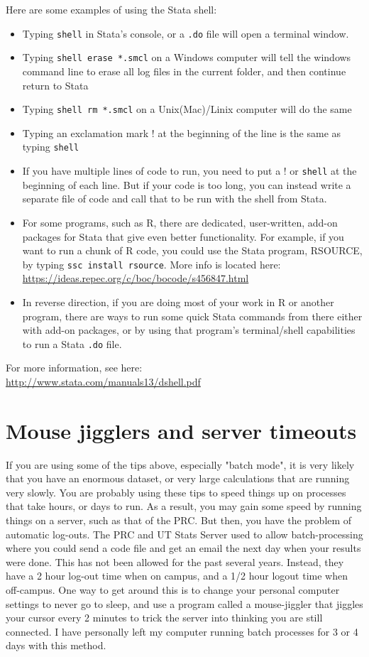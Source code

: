 \documentclass[11pt]{article}
\begin{document}
\noindent Here are some examples of using the Stata shell:
\begin{itemize}
\item Typing \verb!shell! in Stata's console, or a \verb!.do! file will open a terminal window.
\item Typing \verb!shell erase *.smcl! on a Windows computer will tell the windows command line to erase all log files in the current folder, and then continue return to Stata
\item Typing \verb!shell rm *.smcl! on a Unix(Mac)/Linix computer will do the same
\item Typing an exclamation mark \verb!!! at the beginning of the line is the same as typing \verb!shell!
\item If you have multiple lines of code to run, you need to put a \verb!!! or \verb!shell! at the beginning of each line. But if your code is too long, you can instead write a separate file of code and call that to be run with the shell from Stata.
\item For some programs, such as R, there are dedicated, user-written, add-on packages for Stata that give even better functionality. For example, if you want to run a chunk of R code, you could use the Stata program, RSOURCE, by typing \verb!ssc install rsource!. More info is located here: \url{https://ideas.repec.org/c/boc/bocode/s456847.html}
\item In reverse direction, if you are doing most of your work in R or another program, there are ways to run some quick Stata commands from there either with add-on packages, or by using that program's terminal/shell capabilities to run a Stata \verb!.do! file.
\end{itemize}

\noindent For more information, see here:\\
\url{http://www.stata.com/manuals13/dshell.pdf}

\section{Mouse jigglers and server timeouts}

\noindent If you are using some of the tips above, especially "batch mode", it is very likely that you have an enormous dataset, or very large calculations that are running very slowly. You are probably using these tips to speed things up on processes that take hours, or days to run. As a result, you may gain some speed by running things on a server, such as that of the PRC. But then, you have the problem of automatic log-outs. The PRC and UT Stats Server used to allow batch-processing where you could send a code file and get an email the next day when your results were done. This has not been allowed for the past several years. Instead, they have a 2 hour log-out time when on campus, and a 1/2 hour logout time when off-campus. One way to get around this is to change your personal computer settings to never go to sleep, and use a program called a mouse-jiggler that jiggles your cursor every 2 minutes to trick the server into thinking you are still connected. I have personally left my computer running batch processes for 3 or 4 days with this method. \\
\end{document}
